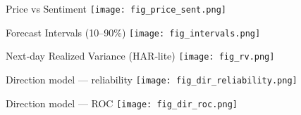 \documentclass[11pt]{beamer}
\begin{document}
\begin{frame}{Price vs Sentiment}
  \centering
  \texttt{[image: fig\_price\_sent.png]}
\end{frame}

\begin{frame}{Forecast Intervals (10--90\%)}
  \centering
  \texttt{[image: fig\_intervals.png]}
\end{frame}

\begin{frame}{Next‑day Realized Variance (HAR‑lite)}
  \centering
  \texttt{[image: fig\_rv.png]}
\end{frame}

\begin{frame}{Direction model — reliability}
  \centering
  \texttt{[image: fig\_dir\_reliability.png]}
\end{frame}

\begin{frame}{Direction model — ROC}
  \centering
  \texttt{[image: fig\_dir\_roc.png]}
\end{frame}
\end{document}
